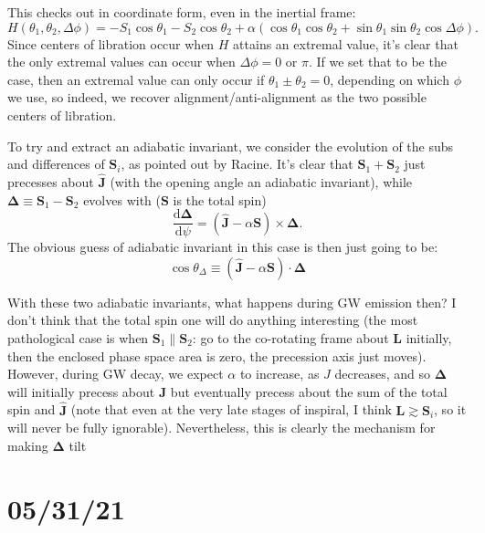 \documentclass[11pt,
        usenames, %
        dvipsnames %
    ]{article}
\newcommand*{\rd}[2]{\frac{\mathrm{d}#1}{\mathrm{d}#2}}
\newcommand*{\bm}[1]{\boldsymbol{\mathbf{#1}}}
\newcommand*{\uv}[1]{\hat{\bm{#1}}}
\newcommand*{\p}[1]{\left(#1\right)}
\begin{document}
This checks out in coordinate form, even in the inertial frame:
\begin{equation}
    H\p{\theta_1, \theta_2, \Delta \phi}
        = -S_1 \cos \theta_1 - S_2 \cos \theta_2
            + \alpha\p{\cos \theta_1 \cos \theta_2
                + \sin \theta_1 \sin \theta_2 \cos \Delta \phi}.
\end{equation}
Since centers of libration occur when $H$ attains an extremal value, it's clear
that the only extremal values can occur when $\Delta \phi = 0$ or $\pi$. If we
set that to be the case, then an extremal value can only occur if $\theta_1 \pm
\theta_2 = 0$, depending on which $\phi$ we use, so indeed, we recover
alignment/anti-alignment as the two possible centers of libration.

To try and extract an adiabatic invariant, we consider the evolution of the subs
and differences of $\bm{S}_i$, as pointed out by Racine. It's clear that
$\bm{S}_1 + \bm{S}_2$ just precesses about $\uv{J}$ (with the opening angle an
adiabatic invariant), while $\bm{\Delta} \equiv \bm{S}_1 - \bm{S}_2$ evolves
with ($\bm{S}$ is the total spin)
\begin{equation}
    \rd{\bm{\Delta}}{\psi} = \p{\uv{J} - \alpha \bm{S}} \times \bm{\Delta}.
\end{equation}
The obvious guess of adiabatic invariant in this case is then just going to be:
\begin{equation}
    \cos \theta_\Delta \equiv \p{\uv{J} - \alpha \bm{S}} \cdot \bm{\Delta}
\end{equation}

With these two adiabatic invariants, what happens during GW emission then? I
don't think that the total spin one will do anything interesting (the most
pathological case is when $\bm{S}_1 \parallel \bm{S}_2$: go to the co-rotating
frame about $\bm{L}$ initially, then the enclosed phase space area is zero, the
precession axis just moves). However, during GW decay, we expect $\alpha$ to
increase, as $J$ decreases, and so $\bm{\Delta}$ will initially precess about
$\bm{J}$ but eventually precess about the sum of the total spin and $\uv{J}$
(note that even at the very late stages of inspiral, I think $\bm{L} \gtrsim
\bm{S}_i$, so it will never be fully ignorable). Nevertheless, this is clearly
the mechanism for making $\bm{\Delta}$ tilt

\section{05/31/21}
\end{document}
